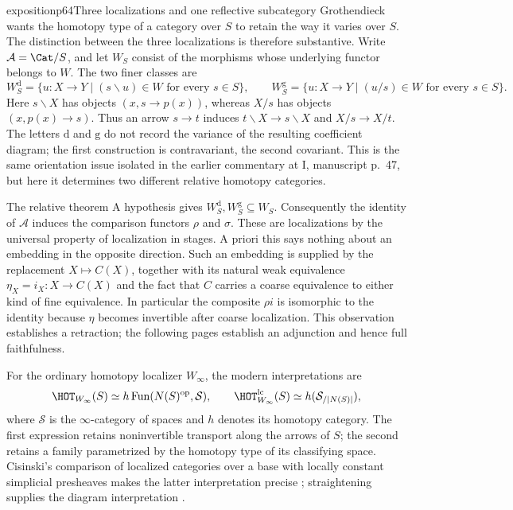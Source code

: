 \begin{dcomment}{exposition}{p64}{Three localizations and one reflective subcategory}
Grothendieck wants the homotopy type of a category over $S$ to retain the way it varies over $S$. The distinction between the three localizations is therefore substantive. Write $\mathcal A=\Cat/S$, and let $W_S$ consist of the morphisms whose underlying functor belongs to $W$. The two finer classes are
\[
 W_S^{\mathrm d}=\{u:X\to Y\mid (s\backslash u)\in W\text{ for every }s\in S\},\qquad
 W_S^{\mathrm g}=\{u:X\to Y\mid (u/s)\in W\text{ for every }s\in S\}.
\]
Here $s\backslash X$ has objects $(x,s\to p(x))$, whereas $X/s$ has objects $(x,p(x)\to s)$. Thus an arrow $s\to t$ induces $t\backslash X\to s\backslash X$ and $X/s\to X/t$. The letters $\mathrm d$ and $\mathrm g$ do not record the variance of the resulting coefficient diagram; the first construction is contravariant, the second covariant. This is the same orientation issue isolated in the earlier commentary at I, manuscript p.~47, but here it determines two different relative homotopy categories.

The relative theorem A hypothesis gives $W_S^{\mathrm d},W_S^{\mathrm g}\subseteq W_S$. Consequently the identity of $\mathcal A$ induces the comparison functors $\rho$ and $\sigma$. These are localizations by the universal property of localization in stages. A priori this says nothing about an embedding in the opposite direction. Such an embedding is supplied by the replacement $X\mapsto C(X)$, together with its natural weak equivalence $\eta_X=i_X:X\to C(X)$ and the fact that $C$ carries a coarse equivalence to either kind of fine equivalence. In particular the composite $\rho i$ is isomorphic to the identity because $\eta$ becomes invertible after coarse localization. This observation establishes a retraction; the following pages establish an adjunction and hence full faithfulness.

For the ordinary homotopy localizer $W_\infty$, the modern interpretations are
\[
 \HOT_{W_\infty}(S)\simeq h\operatorname{Fun}(N(S)^{\mathrm{op}},\mathcal S),
 \qquad
 \HOT^{\mathrm{lc}}_{W_\infty}(S)\simeq h(\mathcal S_{/|N(S)|}),
\]
where $\mathcal S$ is the $\infty$-category of spaces and $h$ denotes its homotopy category. The first expression retains noninvertible transport along the arrows of $S$; the second retains a family parametrized by the homotopy type of its classifying space. Cisinski's comparison of localized categories over a base with locally constant simplicial presheaves makes the latter interpretation precise \citep[\S4.1, especially (4.1.2)]{Cisinski2009LocallyConstant}; straightening supplies the diagram interpretation \citep[Theorem~2.2.1.2]{Lurie2009}.


\end{dcomment}
